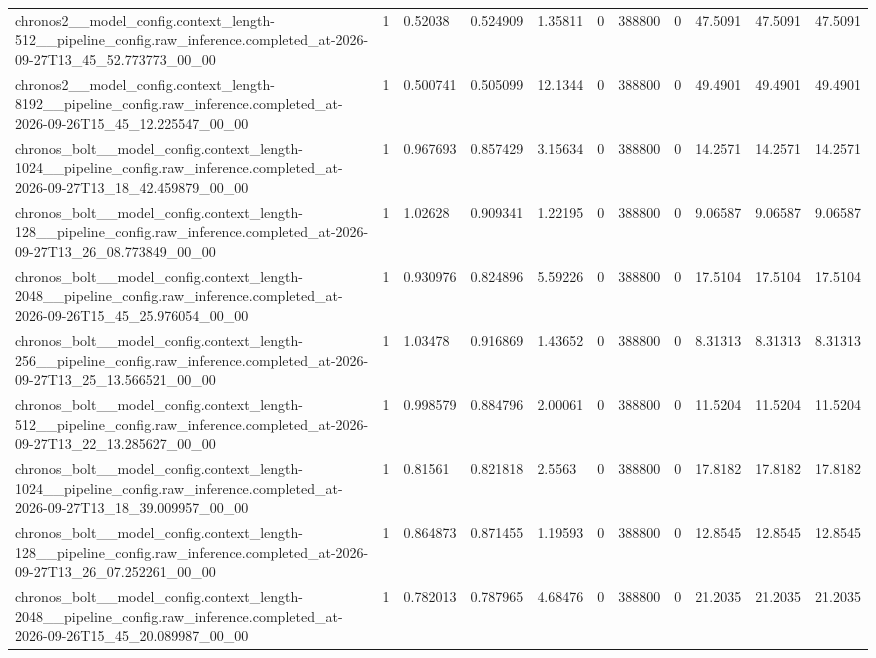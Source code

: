 \begin{tabular}{lllllllllll}
chronos2\_\_model\_config.context\_length-512\_\_pipeline\_config.raw\_inference.completed\_at-2026-09-27T13\_45\_52.773773\_00\_00 & 1 & 0.52038 & 0.524909 & 1.35811 & 0 & 388800 & 0 & 47.5091 & 47.5091 & 47.5091 \\
chronos2\_\_model\_config.context\_length-8192\_\_pipeline\_config.raw\_inference.completed\_at-2026-09-26T15\_45\_12.225547\_00\_00 & 1 & 0.500741 & 0.505099 & 12.1344 & 0 & 388800 & 0 & 49.4901 & 49.4901 & 49.4901 \\
chronos\_bolt\_\_model\_config.context\_length-1024\_\_pipeline\_config.raw\_inference.completed\_at-2026-09-27T13\_18\_42.459879\_00\_00 & 1 & 0.967693 & 0.857429 & 3.15634 & 0 & 388800 & 0 & 14.2571 & 14.2571 & 14.2571 \\
chronos\_bolt\_\_model\_config.context\_length-128\_\_pipeline\_config.raw\_inference.completed\_at-2026-09-27T13\_26\_08.773849\_00\_00 & 1 & 1.02628 & 0.909341 & 1.22195 & 0 & 388800 & 0 & 9.06587 & 9.06587 & 9.06587 \\
chronos\_bolt\_\_model\_config.context\_length-2048\_\_pipeline\_config.raw\_inference.completed\_at-2026-09-26T15\_45\_25.976054\_00\_00 & 1 & 0.930976 & 0.824896 & 5.59226 & 0 & 388800 & 0 & 17.5104 & 17.5104 & 17.5104 \\
chronos\_bolt\_\_model\_config.context\_length-256\_\_pipeline\_config.raw\_inference.completed\_at-2026-09-27T13\_25\_13.566521\_00\_00 & 1 & 1.03478 & 0.916869 & 1.43652 & 0 & 388800 & 0 & 8.31313 & 8.31313 & 8.31313 \\
chronos\_bolt\_\_model\_config.context\_length-512\_\_pipeline\_config.raw\_inference.completed\_at-2026-09-27T13\_22\_13.285627\_00\_00 & 1 & 0.998579 & 0.884796 & 2.00061 & 0 & 388800 & 0 & 11.5204 & 11.5204 & 11.5204 \\
chronos\_bolt\_\_model\_config.context\_length-1024\_\_pipeline\_config.raw\_inference.completed\_at-2026-09-27T13\_18\_39.009957\_00\_00 & 1 & 0.81561 & 0.821818 & 2.5563 & 0 & 388800 & 0 & 17.8182 & 17.8182 & 17.8182 \\
chronos\_bolt\_\_model\_config.context\_length-128\_\_pipeline\_config.raw\_inference.completed\_at-2026-09-27T13\_26\_07.252261\_00\_00 & 1 & 0.864873 & 0.871455 & 1.19593 & 0 & 388800 & 0 & 12.8545 & 12.8545 & 12.8545 \\
chronos\_bolt\_\_model\_config.context\_length-2048\_\_pipeline\_config.raw\_inference.completed\_at-2026-09-26T15\_45\_20.089987\_00\_00 & 1 & 0.782013 & 0.787965 & 4.68476 & 0 & 388800 & 0 & 21.2035 & 21.2035 & 21.2035 \\

\end{tabular}
